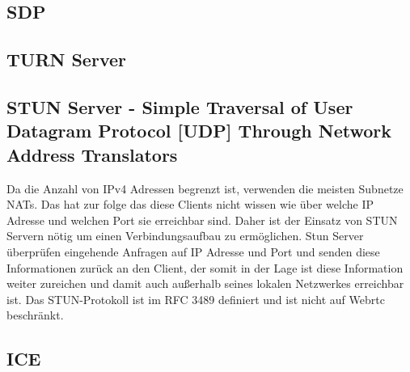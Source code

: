 
\subsection{SDP}

\subsection{TURN Server}

\subsection{STUN Server - Simple Traversal of User Datagram Protocol [UDP] Through Network Address Translators}

Da die Anzahl von IPv4 Adressen begrenzt ist, verwenden die meisten Subnetze NATs. Das hat zur folge das diese Clients nicht wissen wie über welche IP Adresse und welchen Port sie erreichbar sind. Daher ist der Einsatz von STUN Servern nötig um einen Verbindungsaufbau zu ermöglichen. Stun Server überprüfen eingehende Anfragen auf IP Adresse und Port und senden diese Informationen zurück an den Client, der somit in der Lage ist diese Information weiter zureichen und damit auch außerhalb seines lokalen Netzwerkes erreichbar ist. Das STUN-Protokoll ist im RFC 3489 \cite{rfcStun} definiert und ist nicht auf Webrtc beschränkt.


%
%

\subsection{ICE}


